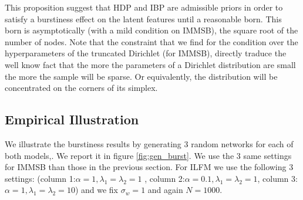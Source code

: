 This proposition suggest that HDP and IBP are admissible priors in order to satisfy a burstiness effect on the latent features until a reasonable born. This born is asymptotically  (with a mild condition on IMMSB), the square root of the number of nodes. Note that the constraint that we find for the condition over the hyperparameters of the truncated Dirichlet (for IMMSB), directly traduce the well know fact that the more the parameters of a Dirichlet distribution are small the more the sample will be sparse. Or equivalently, the distribution will be concentrated on the corners of its simplex.

\subsection{Empirical Illustration}

We illustrate the burstiness results by generating 3 random networks for each of both models,. We report it in figure \ref{fig:gen_burst}. We use the 3 same settings for IMMSB  than those in the previous section. For ILFM  we use the following 3 settings: (column 1:$\alpha=1,  \lambda_1=\lambda_2=1$ , column 2:$\alpha=0.1, \lambda_1=\lambda_2=1$, column 3: $\alpha=1, \lambda_1=\lambda_2=10$) and we fix $\sigma_w=1$ and again $N=1000$.

